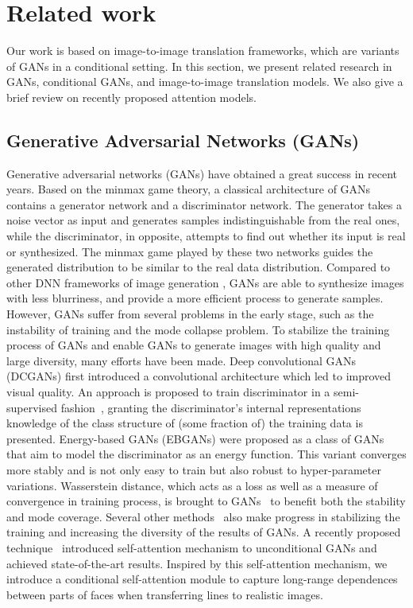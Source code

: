 \section{Related work} 
\label{sec:related_work}
Our work is based on image-to-image translation frameworks, which are variants of GANs in a conditional setting. In this section, we present related research in GANs, conditional GANs, and image-to-image translation models. We also give a brief review on recently proposed attention models.
\subsection{Generative Adversarial Networks (GANs)}
Generative adversarial networks (GANs) \cite{GANs} have obtained a great success in recent years.
Based on the minmax game theory, a classical architecture of GANs contains a generator network and a discriminator network. The generator takes a noise vector as input and generates samples indistinguishable from the real ones, while the discriminator, in opposite, attempts to find out whether its input is real or synthesized. The minmax game played by these two networks guides the generated distribution to be similar to the real data distribution. 
Compared to other DNN frameworks of image generation \cite{VAEs, PixelCNN}, GANs are able to synthesize images with less blurriness, and provide a more efficient process to generate samples. However, GANs suffer from several problems in the early stage, such as the instability of training and the mode collapse problem. To stabilize the training process of GANs and enable GANs to generate images with high quality and large diversity, many efforts have been made. 
Deep convolutional GANs (DCGANs) \cite{DCGANs} first introduced a convolutional architecture which led to improved visual quality. 
An approach is proposed to train discriminator in a semi-supervised fashion~\cite{Improved_Techniques}, granting the discriminator's internal representations knowledge of the class structure of (some fraction of) the training data is presented. 
Energy-based GANs (EBGANs) \cite{EBGANs} were proposed as a class of GANs that aim to model the discriminator as an energy function. 
This variant converges more stably and is not only easy to train but also robust to hyper-parameter variations. 
Wasserstein distance, which acts as a loss as well as a measure of convergence in training process, is brought to GANs~\cite{WGANs, WGAN-GP} to benefit both the stability and mode coverage. 
Several other methods~\cite{LSGANs, BEGANs, DRAGANs} also make progress in stabilizing the training and increasing the diversity of the results of GANs. 
A recently proposed technique~\cite{SAGANs} introduced self-attention mechanism to unconditional GANs and achieved state-of-the-art results. 
%
Inspired by this self-attention mechanism, we introduce a conditional self-attention module to capture long-range dependences between parts of faces when transferring lines to realistic images. 
%


